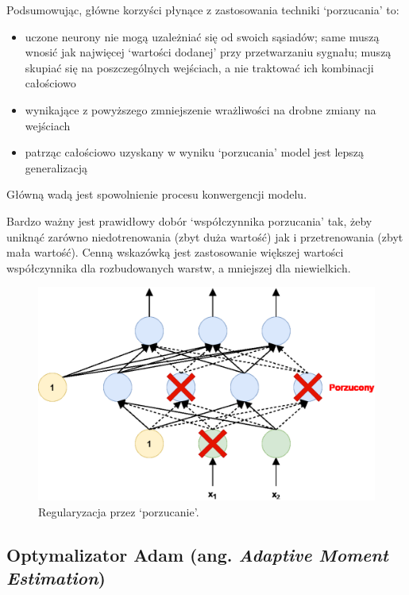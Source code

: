 \documentclass[a4paper,12pt]{article}
\numberwithin{figure}{section}
\begin{document}
    \bigskip

    Podsumowując, główne korzyści płynące z zastosowania techniki `porzucania' to\cite{UczenieMaszynowe2018}:
    \begin{itemize}
        \item uczone neurony nie mogą uzależniać się od swoich sąsiadów; same muszą wnosić jak najwięcej `wartości dodanej' przy przetwarzaniu sygnału; muszą skupiać się na poszczególnych wejściach, a nie traktować ich kombinacji całościowo
        \item wynikające z powyższego zmniejszenie wrażliwości na drobne zmiany na wejściach
        \item patrząc całościowo uzyskany w wyniku `porzucania' model jest lepszą generalizacją
    \end{itemize}
    \smallskip
    Główną wadą jest spowolnienie procesu konwergencji modelu\cite{UczenieMaszynowe2018}.

    \bigskip

    Bardzo ważny jest prawidłowy dobór `współczynnika porzucania' tak, żeby uniknąć zarówno niedotrenowania (zbyt duża wartość) jak i przetrenowania (zbyt mała wartość). Cenną wskazówką jest zastosowanie większej wartości współczynnika dla rozbudowanych warstw, a mniejszej dla niewielkich.

    \bigskip

    \begin{figure}[H]
        \centering
        \includegraphics[width=\textwidth]{dropout}
        \caption{Regularyzacja przez `porzucanie'\cite{UczenieMaszynowe2018}.}
        \label{fig:dropout}
    \end{figure}

    \subsection{Optymalizator Adam (ang. \textit{Adaptive Moment Estimation})}
\end{document}
